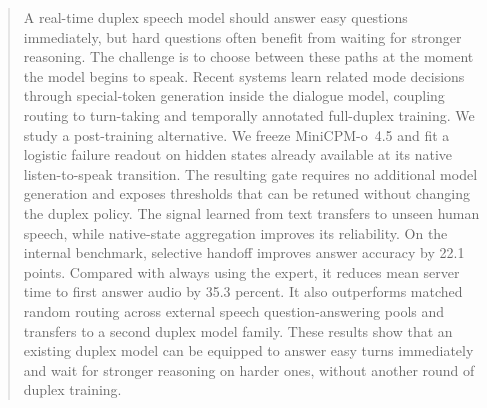 \begin{abstract}
A real-time duplex speech model should answer easy questions immediately, but
hard questions often benefit from waiting for stronger reasoning. The challenge
is to choose between these paths at the moment the model begins to speak.
Recent systems learn related mode decisions through special-token generation
inside the dialogue model, coupling routing to turn-taking and temporally
annotated full-duplex training. We study a post-training alternative. We freeze
MiniCPM-o~4.5 and fit a logistic failure readout on hidden states already
available at its native listen-to-speak transition. The resulting gate requires
no additional model generation and exposes thresholds that can be retuned
without changing the duplex policy. The signal learned from text transfers to
unseen human speech, while native-state aggregation improves its reliability.
On the internal benchmark, selective handoff improves answer accuracy by 22.1
points. Compared with always using the expert, it reduces mean server time to
first answer audio by 35.3 percent. It also outperforms matched random routing
across external speech question-answering pools and transfers to a second
duplex model family. These results show that an existing duplex model can be
equipped to answer easy turns immediately and wait for stronger reasoning on
harder ones, without another round of duplex training.
\end{abstract}
